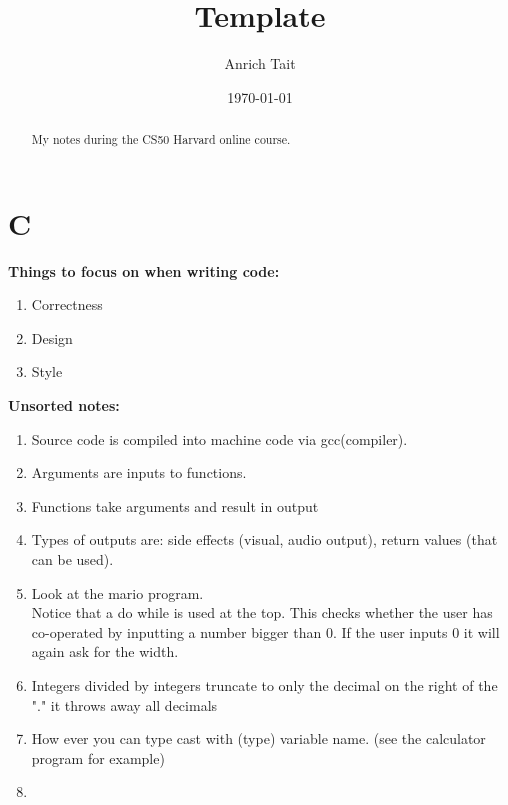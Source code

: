 \documentclass[12pt, letterpaper]{report}
\title{Template}
\author{Anrich Tait}
\date{\today}
\begin{document}
\restoregeometry %
\nopagecolor%

\tableofcontents
\begin{abstract}
My notes during the CS50 Harvard online course.
\end{abstract}

\chapter{C}
\textbf{Things to focus on when writing code:}
\begin{enumerate}
	\item Correctness
	\item Design
	\item Style
\end{enumerate}


\textbf{Unsorted notes:}
\begin{enumerate}
	\item Source code is compiled into machine code via gcc(compiler).
	\item Arguments are inputs to functions.
	\item Functions take arguments and result in output
	\item Types of outputs are: side effects (visual, audio output), return values (that can be used).
	\item Look at the mario program. \\
		Notice that a do while is used at the top. This checks whether the user has co-operated by inputting a number bigger than 0. If the user inputs 0 it will again ask for the width.
	\item Integers divided by integers truncate to only the decimal on the right of the "." it throws away all decimals
	\item How ever you can type cast with (type) variable name. (see the calculator program for example)
	\item 
\end{enumerate}
\end{document}
